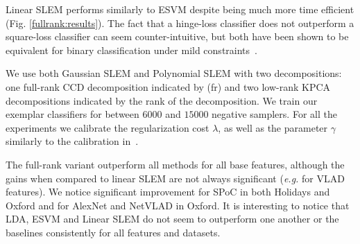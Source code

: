Linear SLEM performs similarly to ESVM despite being much more time efficient (Fig. \ref{fullrank:results}). 
The fact that a hinge-loss classifier does not outperform a square-loss classifier can seem counter-intuitive, but both have been shown to be equivalent for binary classification under mild constraints~\cite{YeXi07}.

We use both Gaussian SLEM and Polynomial SLEM with two decompositions: one full-rank CCD decomposition indicated by (fr) and two low-rank KPCA decompositions indicated by the rank of the decomposition. We train our exemplar classifiers for between $6000$ and $15000$ negative samplers. For all the experiments we calibrate the regularization cost $\lambda$, as well as the parameter $\gamma$ similarly to the calibration in~\cite{ZePe15}.

The full-rank variant outperform all methods for all base features, although the gains when compared to linear SLEM are not always significant (\emph{e.g.} for VLAD features). We notice significant improvement for SPoC in both Holidays and Oxford and for AlexNet and NetVLAD in Oxford. It is interesting to notice that LDA, ESVM and Linear SLEM do not seem to outperform one another or the baselines consistently for all features and datasets.





